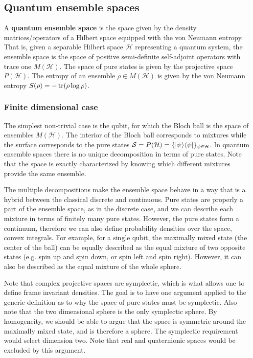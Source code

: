 \subsection{Quantum ensemble spaces}

\begin{defn}
	A \textbf{quantum ensemble space} is the space given by the density matrices/operators of a Hilbert space equipped with the von Neumann entropy. That is, given a separable Hilbert space $\mathcal{H}$ representing a quantum system, the ensemble space is the space of positive semi-definite self-adjoint operators with trace one $M(\mathcal{H})$. The space of pure states is given by the projective space $P(\mathcal{H})$. The entropy of an ensemble $\rho \in M(\mathcal{H})$ is given by the von Neumann entropy $S(\rho) = -\operatorname{tr}(\rho \log \rho)$.
\end{defn}

\subsubsection{Finite dimensional case}

The simplest non-trivial case is the qubit, for which the Bloch ball is the space of ensembles $M(\mathcal{H})$. The interior of the Bloch ball corresponds to mixtures  while the surface corresponds to the pure states $\mathcal{S} = P(\mathcal{H}) = \{ |\psi\rangle \langle\psi| \}_{\psi \in \mathcal{H}}$. In quantum ensemble spaces there is no unique decomposition in terms of pure states. Note that the space is exactly characterized by knowing which different mixtures provide the same ensemble.

The multiple decompositions make the ensemble space behave in a way that is a hybrid between the classical discrete and continuous. Pure states are properly a part of the ensemble space, as in the discrete case, and we can describe each mixture in terms of finitely many pure states. However, the pure states form a continuum, therefore we can also define probability densities over the space, convex integrals. For example, for a single qubit, the maximally mixed state (the center of the ball) can be equally described as the equal mixture of two opposite states (e.g. spin up and spin down, or spin left and spin right). However, it can also be described as the equal mixture of the whole sphere.

Note that complex projective spaces are symplectic, which is what allows one to define frame invariant densities. The goal is to have one argument applied to the generic definition as to why the space of pure states must be symplectic. Also note that the two dimensional sphere is the only symplectic sphere. By homogeneity, we should be able to argue that the space is symmetric around the maximally mixed state, and is therefore a sphere. The symplectic requirement would select dimension two. Note that real and quaternionic spaces would be excluded by this argument.

